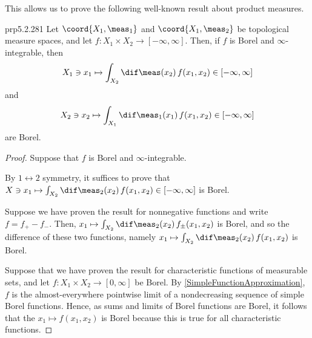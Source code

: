 This allows us to prove the following well-known result about product measures.
\begin{prp}{}{prp5.2.281}
Let $\coord{X_1,\meas _1}$ and $\coord{X_1,\meas _2}$ be topological measure spaces, and let $f\colon X_1\times X_2\rightarrow [-\infty ,\infty ]$.  Then, if $f$ is Borel and $\infty$-integrable, then
\begin{equation}
X_1\ni x_1\mapsto \int _{X_2}\dif \meas (x_2)\, f(x_1,x_2)\in [-\infty ,\infty]
\end{equation}
and
\begin{equation}
X_2\ni x_2\mapsto \int _{X_1}\dif \meas _1(x_1)\, f(x_1,x_2)\in [-\infty ,\infty ]
\end{equation}
are Borel.
\begin{proof}
Suppose that $f$ is Borel and $\infty$-integrable.

By $1\leftrightarrow 2$ symmetry, it suffices to prove that $X\ni x_1\mapsto \int _{X_2}\dif \meas _2(x_2)\, f(x_1,x_2)\in [-\infty ,\infty ]$ is Borel.

Suppose we have proven the result for nonnegative functions and write $f=f_+-f_-$.  Then, $x_1\mapsto \int _{X_2}\dif \meas _2(x_2)\, f_{\pm}(x_1,x_2)$ is Borel, and so the difference of these two functions, namely $x_1\mapsto \int _{X_2}\dif \meas _2(x_2)\, f(x_1,x_2)$ is Borel.

Suppose that we have proven the result for characteristic functions of measurable sets, and let $f\colon X_1\times X_2\rightarrow [0,\infty ]$ be Borel.  By \cref{SimpleFunctionApproximation}, $f$ is the almost-everywhere pointwise limit of a nondecreasing sequence of simple Borel functions.  Hence, as sums and limits of Borel functions are Borel, it follows that the $x_1\mapsto f(x_1,x_2)$ is Borel because this is true for all characteristic functions.


\end{proof}
\end{prp}
